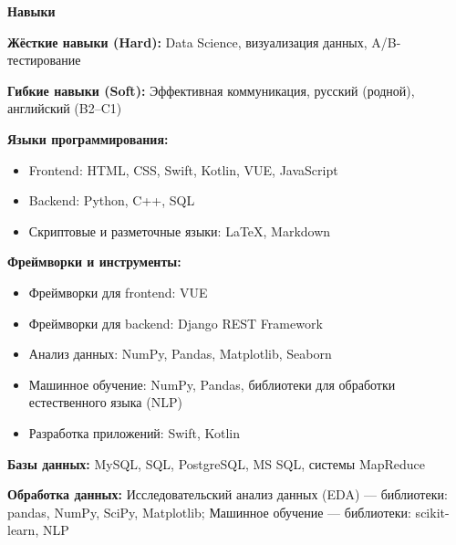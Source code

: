 \begin{center}
    \textbf{Навыки}
\end{center}

\textbf{Жёсткие навыки (Hard):} Data Science, визуализация данных, A/B-тестирование

\textbf{Гибкие навыки (Soft):} Эффективная коммуникация, русский (родной), английский (B2–C1)

\textbf{Языки программирования:}
\begin{itemize}[noitemsep, topsep=0pt, partopsep=0pt, parsep=0pt]
    \item Frontend: HTML, CSS, Swift, Kotlin, VUE, JavaScript
    \item Backend: Python, C++, SQL
    \item Скриптовые и разметочные языки: LaTeX, Markdown
\end{itemize}

\textbf{Фреймворки и инструменты:}
\begin{itemize}[noitemsep, topsep=0pt, partopsep=0pt, parsep=0pt]
    \item Фреймворки для frontend: VUE
    \item Фреймворки для backend: Django REST Framework
    \item Анализ данных: NumPy, Pandas, Matplotlib, Seaborn
    \item Машинное обучение: NumPy, Pandas, библиотеки для обработки естественного языка (NLP)
    \item Разработка приложений: Swift, Kotlin
\end{itemize}

\textbf{Базы данных:} MySQL, SQL, PostgreSQL, MS SQL, системы MapReduce

\textbf{Обработка данных:} Исследовательский анализ данных (EDA) — библиотеки: pandas, NumPy, SciPy, Matplotlib; Машинное обучение — библиотеки: scikit-learn, NLP

